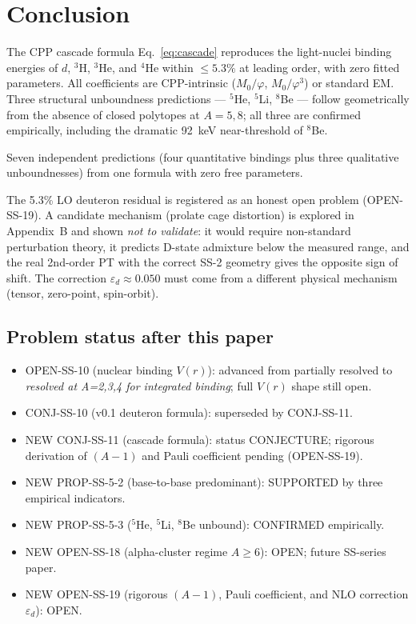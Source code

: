 \documentclass[11pt,letterpaper]{article}
\newcommand{\phig}{\varphi}
\newcommand{\Mzero}{M_0}
\newcommand{\epsd}{\varepsilon_{d}}
\begin{document}
\section{Conclusion}
\label{sec:conclusion}

The CPP cascade formula Eq.~\ref{eq:cascade} reproduces the light-nuclei binding energies of $d$, ${}^3$H, ${}^3$He, and ${}^4$He within $\leq 5.3\%$ at leading order, with zero fitted parameters. All coefficients are CPP-intrinsic ($\Mzero/\phig$, $\Mzero/\phig^3$) or standard EM. Three structural unboundness predictions --- ${}^5$He, ${}^5$Li, ${}^8$Be --- follow geometrically from the absence of closed polytopes at $A = 5, 8$; all three are confirmed empirically, including the dramatic 92~keV near-threshold of ${}^8$Be.

Seven independent predictions (four quantitative bindings plus three qualitative unboundnesses) from one formula with zero free parameters.

The 5.3\% LO deuteron residual is registered as an honest open problem (OPEN-SS-19). A candidate mechanism (prolate cage distortion) is explored in Appendix~B and shown \emph{not to validate}: it would require non-standard perturbation theory, it predicts D-state admixture below the measured range, and the real 2nd-order PT with the correct SS-2 geometry gives the opposite sign of shift. The correction $\epsd \approx 0.050$ must come from a different physical mechanism (tensor, zero-point, spin-orbit).

\subsection{Problem status after this paper}

\begin{itemize}
\item OPEN-SS-10 (nuclear binding $V(r)$): advanced from partially resolved to \emph{resolved at A=2,3,4 for integrated binding}; full $V(r)$ shape still open.
\item CONJ-SS-10 (v0.1 deuteron formula): superseded by CONJ-SS-11.
\item NEW CONJ-SS-11 (cascade formula): status CONJECTURE; rigorous derivation of $(A-1)$ and Pauli coefficient pending (OPEN-SS-19).
\item NEW PROP-SS-5-2 (base-to-base predominant): SUPPORTED by three empirical indicators.
\item NEW PROP-SS-5-3 (${}^5$He, ${}^5$Li, ${}^8$Be unbound): CONFIRMED empirically.
\item NEW OPEN-SS-18 (alpha-cluster regime $A \geq 6$): OPEN; future SS-series paper.
\item NEW OPEN-SS-19 (rigorous $(A-1)$, Pauli coefficient, and NLO correction $\epsd$): OPEN.
\end{itemize}
\end{document}
